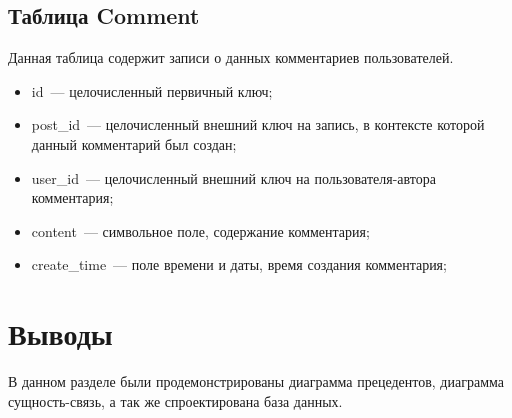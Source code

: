 \subsection{Таблица Comment}%
\label{sub:tablitsa_comment}
Данная таблица содержит записи о данных комментариев пользователей.
\begin{itemize}
    \item id~--- целочисленный первичный ключ;
    \item post\_id~--- целочисленный внешний ключ на запись, в контексте которой данный комментарий был создан;
    \item user\_id~--- целочисленный внешний ключ на пользователя-автора комментария;
    \item content~--- символьное поле, содержание комментария;
    \item create\_time~--- поле времени и даты, время создания комментария;
\end{itemize}

\section{Выводы}%
\label{sec:vyvody}

В данном разделе были продемонстрированы диаграмма прецедентов, диаграмма сущность-связь, а так же спроектирована база данных.
